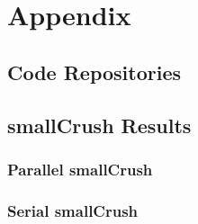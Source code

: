 \chapter{Appendix}

\section{Code Repositories}

\section{smallCrush Results}
\subsection{Parallel smallCrush}
\subsection{Serial smallCrush}

